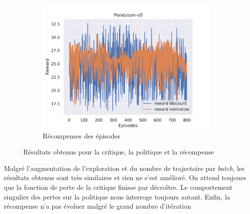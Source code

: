 \begin{figure}[H]
\begin{subfigure}{0.3\textwidth}
    \end{subfigure}
    \begin{subfigure}{0.3\textwidth}
        \includegraphics[width=\textwidth]{figures/iteration4/rewards_Pendulum-v0_pg_dataset_td_eval_True_cycles_800_trajs_200_batches_20_gamma_0.99_nstep_5_lr_act_0.01_lr_critic_0.01.pdf}
        \caption{Récompenses des épisodes}
    \end{subfigure}
    \caption{Résultats obtenus pour la critique, la politique et la récompense}
    \label{fig:itr4_results}
\end{figure}

Malgré l'augmentation de l'exploration et du nombre de trajectoire par \emph{batch}, les résultats obtenus sont très similaires et rien ne s'est amélioré. On attend toujours que la fonction de perte de la critique finisse par décroître. Le comportement singulier des pertes sur la politique nous interroge toujours autant. Enfin, la récompense n'a pas évoluer malgré le grand nombre d'itération

